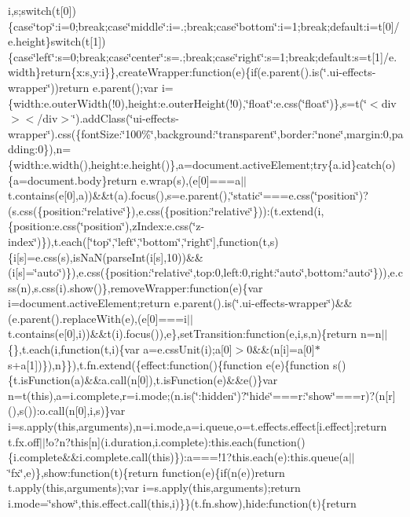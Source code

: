 {{i,s;switch(t\mbox{[}0\mbox{]})\{case\char`\"{}top\char`\"{}\+:i=0;break;case\char`\"{}middle\char`\"{}\+:i=.;break;case\char`\"{}bottom\char`\"{}\+:i=1;break;default\+:i=t\mbox{[}0\mbox{]}/e.\+height\}switch(t\mbox{[}1\mbox{]})\{case\char`\"{}left\char`\"{}\+:s=0;break;case\char`\"{}center\char`\"{}\+:s=.;break;case\char`\"{}right\char`\"{}\+:s=1;break;default\+:s=t\mbox{[}1\mbox{]}/e.\+width\}return\{x\+:s,y\+:i\}\},create\+Wrapper\+:function(e)\{if(e.\+parent().\+is(\char`\"{}.\+ui-\/effects-\/wrapper\char`\"{}))return e.\+parent();var i=\{width\+:e.\+outer\+Width(!0),height\+:e.\+outer\+Height(!0),\char`\"{}float\char`\"{}\+:e.\+css(\char`\"{}float\char`\"{})\},s=t(\char`\"{}$<$div$>$$<$/div$>$\char`\"{}).\+add\+Class(\char`\"{}ui-\/effects-\/wrapper\char`\"{}).\+css(\{font\+Size\+:\char`\"{}100\%\char`\"{},background\+:\char`\"{}transparent\char`\"{},border\+:\char`\"{}none\char`\"{},margin\+:0,padding\+:0\}),n=\{width\+:e.\+width(),height\+:e.\+height()\},a=document.\+active\+Element;try\{a.\+id\}catch(o)\{a=document.\+body\}return e.\+wrap(s),(e\mbox{[}0\mbox{]}===a$\vert$$\vert$t.\+contains(e\mbox{[}0\mbox{]},a))\&\&t(a).\+focus(),s=e.\+parent(),\char`\"{}static\char`\"{}===e.\+css(\char`\"{}position\char`\"{})?(s.\+css(\{position\+:\char`\"{}relative\char`\"{}\}),e.\+css(\{position\+:\char`\"{}relative\char`\"{}\}))\+:(t.\+extend(i,\{position\+:e.\+css(\char`\"{}position\char`\"{}),z\+Index\+:e.\+css(\char`\"{}z-\/index\char`\"{})\}),t.\+each(\mbox{[}\char`\"{}top\char`\"{},\char`\"{}left\char`\"{},\char`\"{}bottom\char`\"{},\char`\"{}right\char`\"{}\mbox{]},function(t,s)\{i\mbox{[}s\mbox{]}=e.\+css(s),is\+Na\+N(parse\+Int(i\mbox{[}s\mbox{]},10))\&\&(i\mbox{[}s\mbox{]}=\char`\"{}auto\char`\"{})\}),e.\+css(\{position\+:\char`\"{}relative\char`\"{},top\+:0,left\+:0,right\+:\char`\"{}auto\char`\"{},bottom\+:\char`\"{}auto\char`\"{}\})),e.\+css(n),s.\+css(i).\+show()\},remove\+Wrapper\+:function(e)\{var i=document.\+active\+Element;return e.\+parent().\+is(\char`\"{}.\+ui-\/effects-\/wrapper\char`\"{})\&\&(e.\+parent().\+replace\+With(e),(e\mbox{[}0\mbox{]}===i$\vert$$\vert$t.\+contains(e\mbox{[}0\mbox{]},i))\&\&t(i).\+focus()),e\},set\+Transition\+:function(e,i,s,n)\{return n=n$\vert$$\vert$\{\},t.\+each(i,function(t,i)\{var a=e.\+css\+Unit(i);a\mbox{[}0\mbox{]}$>$0\&\&(n\mbox{[}i\mbox{]}=a\mbox{[}0\mbox{]}$\ast$s+a\mbox{[}1\mbox{]})\}),n\}\}),t.\+fn.\+extend(\{effect\+:function()\{function e(e)\{function s()\{t.\+is\+Function(a)\&\&a.\+call(n\mbox{[}0\mbox{]}),t.\+is\+Function(e)\&\&e()\}var n=t(this),a=i.\+complete,r=i.\+mode;(n.\+is(\char`\"{}\+:hidden\char`\"{})?\char`\"{}hide\char`\"{}===r\+:\char`\"{}show\char`\"{}===r)?(n\mbox{[}r\mbox{]}(),s())\+:o.\+call(n\mbox{[}0\mbox{]},i,s)\}var i=s.\+apply(this,arguments),n=i.\+mode,a=i.\+queue,o=t.\+effects.\+effect\mbox{[}i.\+effect\mbox{]};return t.\+fx.\+off$\vert$$\vert$!o?n?this\mbox{[}n\mbox{]}(i.\+duration,i.\+complete)\+:this.\+each(function()\{i.\+complete\&\&i.\+complete.\+call(this)\})\+:a===!1?this.\+each(e)\+:this.\+queue(a$\vert$$\vert$\char`\"{}fx\char`\"{},e)\},show\+:function(t)\{return function(e)\{if(n(e))return t.\+apply(this,arguments);var i=s.\+apply(this,arguments);return i.\+mode=\char`\"{}show\char`\"{},this.\+effect.\+call(this,i)\}\}(t.\+fn.\+show),hide\+:function(t)\{return }}
